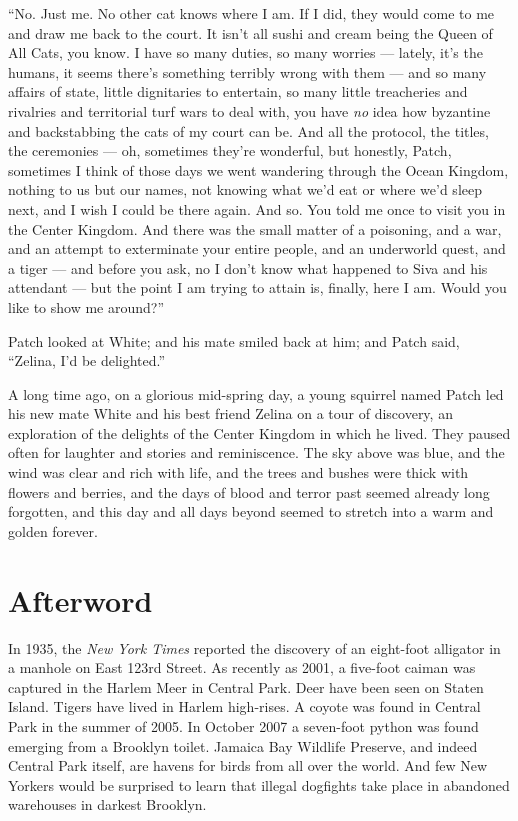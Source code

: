\documentclass[ebook,oneside,openany,12pt]{memoir}
\begin{document}
“No. Just me. No other cat knows where I am. If I did, they would come
to me and draw me back to the court. It isn’t all sushi and cream
being the Queen of All Cats, you know. I have so many duties, so many
worries — lately, it’s the humans, it seems there’s something terribly
wrong with them — and so many affairs of state, little dignitaries to
entertain, so many little treacheries and rivalries and territorial
turf wars to deal with, you have \emph{no} idea how byzantine and
backstabbing the cats of my court can be. And all the protocol, the
titles, the ceremonies — oh, sometimes they’re wonderful, but
honestly, Patch, sometimes I think of those days we went wandering
through the Ocean Kingdom, nothing to us but our names, not knowing
what we’d eat or where we’d sleep next, and I wish I could be there
again. And so. You told me once to visit you in the Center
Kingdom. And there was the small matter of a poisoning, and a war, and
an attempt to exterminate your entire people, and an underworld quest,
and a tiger — and before you ask, no I don’t know what happened to
Siva and his attendant — but the point I am trying to attain is,
finally, here I am. Would you like to show me around?”

Patch looked at White; and his mate smiled back at him; and Patch
said, “Zelina, I’d be delighted.”

A long time ago, on a glorious mid-spring day, a young squirrel named
Patch led his new mate White and his best friend Zelina on a tour of
discovery, an exploration of the delights of the Center Kingdom in
which he lived. They paused often for laughter and stories and
reminiscence. The sky above was blue, and the wind was clear and rich
with life, and the trees and bushes were thick with flowers and
berries, and the days of blood and terror past seemed already long
forgotten, and this day and all days beyond seemed to stretch into a
warm and golden forever.


\section{Afterword}

In 1935, the \emph{New York Times} reported the discovery of an
eight-foot alligator in a manhole on East 123rd Street. As recently as
2001, a five-foot caiman was captured in the Harlem Meer in Central
Park. Deer have been seen on Staten Island. Tigers have lived in
Harlem high-rises. A coyote was found in Central Park in the summer of
2005. In October 2007 a seven-foot python was found emerging from a
Brooklyn toilet. Jamaica Bay Wildlife Preserve, and indeed Central
Park itself, are havens for birds from all over the world. And few New
Yorkers would be surprised to learn that illegal dogfights take place
in abandoned warehouses in darkest Brooklyn.
\end{document}
